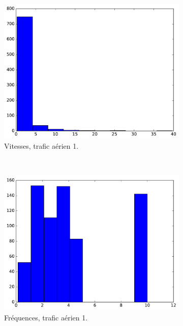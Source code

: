 	\begin{figure}[!htbp]
		\begin{subfigure}[t]{\subImgWclicks}
			\centering
			\includegraphics[width=\textwidth]{figures/ch3/mhA_filteredSpeed}
			\caption{Vitesses, trafic aérien 1.}
			\label{fig:mhA_filteredSpeed}
		\end{subfigure}
		~
		\begin{subfigure}[t]{\subImgWclicks}
			\centering
			\includegraphics[width=\textwidth]{figures/ch3/mhA_frequency}
			\caption{Fréquences, trafic aérien 1.}
			\label{fig:mhA_frequency}
		\end{subfigure}
		~
		\begin{subfigure}[t]{\subImgWclicks}

\end{subfigure}
\end{figure}
